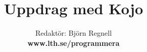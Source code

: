 \documentclass[12pt]{book}
\title{\fontsize{40}{40}\bf\sffamily\selectfont Uppdrag med Kojo} %
\author{Redaktör: Björn Regnell \\ \bf www.lth.se/programmera} %
\date{}
\begin{document}
\maketitle
\newpage
\thispagestyle{empty}


\newpage
\begin{multicols}{3}
\tableofcontents 
\mainmatter
\end{multicols}

\fontsize{16}{18}\selectfont\raggedright

\end{document}
